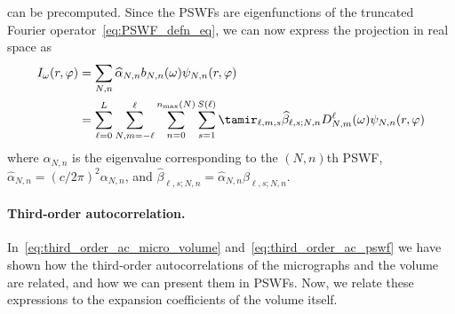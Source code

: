 \documentclass[9pt,twocolumn,twoside,lineno]{pnas-new}
\begin{document}
can be precomputed.
Since the PSWFs are eigenfunctions of the truncated Fourier operator~\eqref{eq:PSWF_defn_eq}, we can now express the projection in real space as
\begin{align} \label{eq:proj_expansion}
I_{\omega}(r,\varphi) &= \sum_{N,n}\widehat{\alpha}_{N,n}b_{N,n}(\omega)\psi_{N,n}(r,\varphi)\nonumber \\
&= \sum_{\ell=0}^L\sum_{N,m=-\ell}^{\ell}\sum_{n=0}^{n_{\text{max}}(N)}\sum_{s=1}^{S(\ell)}\tamir_{\ell,m,s}\widehat\beta_{\ell,s;N,n}D_{N,m}^{\ell}(\omega)\psi_{N,n}(r,\varphi)
\end{align}
where $\alpha_{N,n}$ is the eigenvalue corresponding to the $(N,n)$th PSWF, $\widehat{\alpha}_{N,n} = (c/2\pi)^2\alpha_{N,n}$, and $\widehat\beta_{\ell,s;N,n}=\widehat\alpha_{N,n}\beta_{\ell,s;N,n}$.


\paragraph{Third-order autocorrelation.}
In~\eqref{eq:third_order_ac_micro_volume} and~\eqref{eq:third_order_ac_pswf} we have shown how the third-order autocorrelations of the micrographs and the volume are related, and how we can present them in PSWFs. Now, we relate these expressions to the expansion coefficients of the volume itself.
\end{document}
